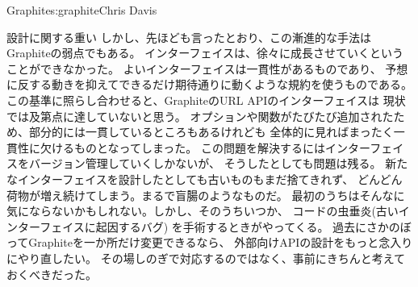 \begin{aosachapter}{Graphite}{s:graphite}{Chris Davis}
\begin{aosasect1}{設計に関する重い}
しかし、先ほども言ったとおり、この漸進的な手法はGraphiteの弱点でもある。
インターフェイスは、徐々に成長させていくということができなかった。
よいインターフェイスは一貫性があるものであり、
予想に反する動きを抑えてできるだけ期待通りに動くような規約を使うものである。
この基準に照らし合わせると、GraphiteのURL APIのインターフェイスは
現状では及第点に達していないと思う。
オプションや関数がたびたび追加されたため、部分的には一貫しているところもあるけれども
全体的に見ればまったく一貫性に欠けるものとなってしまった。
この問題を解決するにはインターフェイスをバージョン管理していくしかないが、
そうしたとしても問題は残る。
新たなインターフェイスを設計したとしても古いものもまだ捨てきれず、
どんどん荷物が増え続けてしまう。まるで盲腸のようなものだ。
最初のうちはそんなに気にならないかもしれない。しかし、そのうちいつか、
コードの虫垂炎(古いインターフェイスに起因するバグ)
を手術するときがやってくる。
過去にさかのぼってGraphiteを一か所だけ変更できるなら、
外部向けAPIの設計をもっと念入りにやり直したい。
その場しのぎで対応するのではなく、事前にきちんと考えておくべきだった。


\end{aosasect1}
\end{aosachapter}
